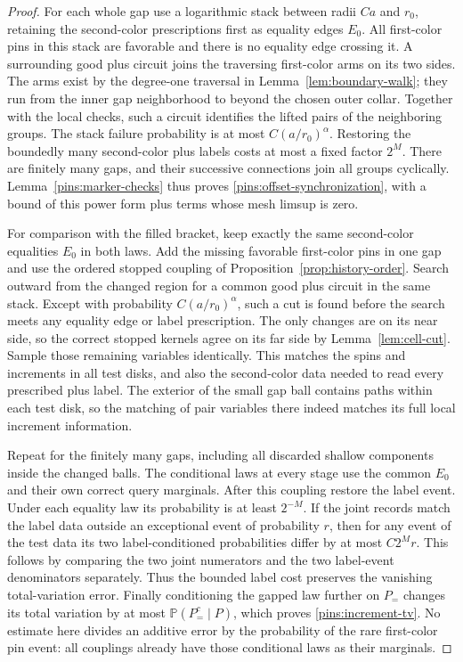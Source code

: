 \documentclass[11pt]{article}
\theoremstyle{definition}
\theoremstyle{remark}
\numberwithin{equation}{section}
\begin{document}
\begin{proof}
For each whole gap use a logarithmic stack between radii $Ca$ and
$r_0$, retaining the second-color prescriptions first as equality
edges $E_0$.  All first-color pins in this stack are favorable and
there is no equality edge crossing it.  A surrounding good plus circuit
joins the traversing first-color arms on its two sides.  The arms
exist by the degree-one traversal in Lemma~\ref{lem:boundary-walk};
they run from the inner gap neighborhood to beyond the chosen outer
collar.  Together with the local checks, such a circuit identifies
the lifted pairs of the neighboring groups.  The stack failure
probability is at most $C(a/r_0)^\alpha$.  Restoring the boundedly
many second-color plus labels costs at most a fixed factor $2^M$.
There are finitely many gaps, and their successive connections join
all groups cyclically.  Lemma~\ref{pins:marker-checks} thus proves
\eqref{pins:offset-synchronization}, with a bound of this power form
plus terms whose mesh limsup is zero.

For comparison with the filled bracket, keep exactly the same
second-color equalities $E_0$ in both laws.  Add the missing favorable
first-color pins in one gap and use the ordered stopped coupling of
Proposition~\ref{prop:history-order}.  Search outward from the changed
region for a common good plus circuit in the same stack.  Except
with probability $C(a/r_0)^\alpha$, such a cut is found before the
search meets any equality edge or label prescription.  The only
changes are on its near side, so the correct stopped kernels agree
on its far side by Lemma~\ref{lem:cell-cut}.  Sample those remaining
variables identically.  This matches the spins and increments in all
test disks, and also the second-color data needed to read every
prescribed plus label.  The exterior of the small gap ball contains
paths within each test disk, so the matching of pair variables there
indeed matches its full local increment information.

Repeat for the finitely many gaps, including all discarded shallow
components inside the changed balls.  The conditional laws at every
stage use the common $E_0$ and their own correct query marginals.
After this coupling restore the label event.  Under each equality law
its probability is at least $2^{-M}$.  If the joint records match the
label data outside an exceptional event of probability $r$, then for
any event of the test data its two label-conditioned probabilities
differ by at most $C2^M r$.  This follows by comparing the two joint
numerators and the two label-event denominators separately.  Thus the
bounded label cost preserves the vanishing total-variation error.
Finally conditioning the gapped law further on $P_=$ changes its
total variation by at most $\mathbb P(P_=^c\mid P)$, which proves
\eqref{pins:increment-tv}.  No estimate here divides an additive
error by the probability of the rare first-color pin event: all
couplings already have those conditional laws as their marginals.


\end{proof}
\end{document}
